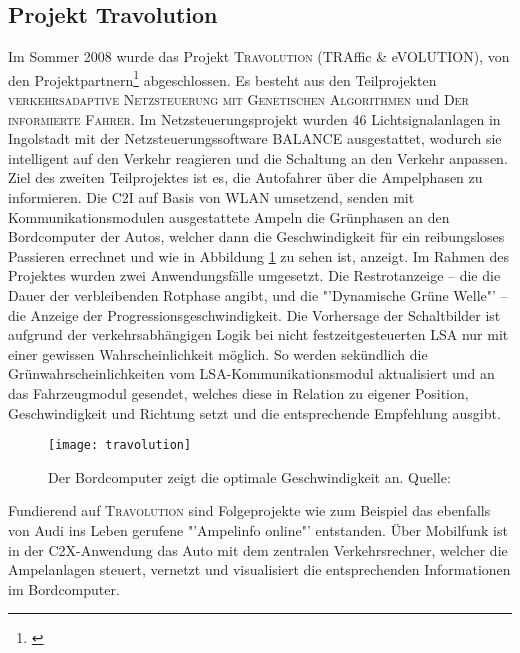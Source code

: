 \subsection*{Projekt Travolution}
Im Sommer 2008 wurde das Projekt \textsc{Travolution} (TRAffic \& eVOLUTION), von den Projektpartnern\footnote{\cite{Travolution}} abgeschlossen. Es besteht aus den Teilprojekten \textsc{verkehrsadaptive Netzsteuerung mit Genetischen Algorithmen} und \textsc{Der informierte Fahrer}. Im Netzsteuerungsprojekt wurden 46 Lichtsignalanlagen in Ingolstadt mit der Netzsteuerungssoftware BALANCE ausgestattet, wodurch sie intelligent auf den Verkehr reagieren und die Schaltung an den Verkehr anpassen.  Ziel des zweiten Teilprojektes ist es, die Autofahrer über die Ampelphasen zu informieren. Die \gls{C2I} auf Basis von \gls{WLAN} umsetzend, senden mit Kommunikationsmodulen ausgestattete Ampeln die Grünphasen an den Bordcomputer der Autos, welcher dann die Geschwindigkeit für ein reibungsloses Passieren errechnet\cite{Stvtechnik} und wie in Abbildung \ref{fig:travolution} zu sehen ist, anzeigt. Im Rahmen des Projektes wurden zwei Anwendungsfälle umgesetzt. Die Restrotanzeige -- die die Dauer der verbleibenden Rotphase angibt, und die "'Dynamische Grüne Welle"' -- die Anzeige der Progressionsgeschwindigkeit.
Die Vorhersage der Schaltbilder ist aufgrund der verkehrsabhängigen Logik bei nicht festzeitgesteuerten \gls{LSA} nur mit einer gewissen Wahrscheinlichkeit möglich. So werden sekündlich die Grünwahrscheinlichkeiten vom \gls{LSA}-Kommunikationsmodul aktualisiert und an das Fahrzeugmodul gesendet, welches diese in Relation zu eigener Position, Geschwindigkeit und Richtung setzt und die entsprechende Empfehlung ausgibt.
\begin{figure}[H]  
    \centering  
    \texttt{[image: travolution]}      
    \caption[Projekt Travolution]{Der Bordcomputer zeigt die optimale Geschwindigkeit an. Quelle: \cite{Travolution}}
    \label{fig:travolution}
\end{figure} 
Fundierend auf \textsc{Travolution} sind Folgeprojekte wie zum Beispiel das ebenfalls von Audi ins Leben gerufene "'Ampelinfo online"' entstanden. Über Mobilfunk ist in der \gls{C2X}-Anwendung das Auto mit dem zentralen Verkehrsrechner, welcher die Ampelanlagen steuert, vernetzt und visualisiert die entsprechenden Informationen im Bordcomputer. \cite{Ampelinfo}
